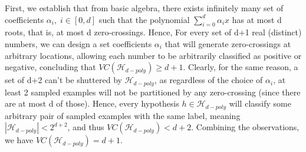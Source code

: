 First, we establish that from basic algebra, there exists infinitely many set of coefficients 
$\alpha_i, \; i\in [0, d]$ such that the polynomial $\sum_{i=0}^d \alpha_i x$ has at most d roots, 
that is, at most d zero-crossings. Hence, For every set of d+1 real (distinct) numbers, we can design 
a set coefficients $\alpha_i$ that will generate zero-crossings at arbitrary locations, allowing each number
to be arbitrarily classified as positive or negative, concluding that $VC(\mathcal{H}_{d-poly}) \geq d+1$.
Clearly, for the same reason, a set of d+2 can't be shuttered by $\mathcal{H}_{d-poly}$, as regardless of the 
choice of $\alpha_i$, at least 2 sampled examples will not be partitioned by any zero-crossing (since there are at most d of those). Hence, every hypothesis $h \in \mathcal{H}_{d-poly}$ will classify some arbitrary pair of sampled examples 
with the same label, meaning $|\mathcal{H}_{d-poly}| < 2^{d+2}$, and thus $VC(\mathcal{H}_{d-poly}) < d+2$.
Combining the observations, we have $VC(\mathcal{H}_{d-poly}) = d+1$.
